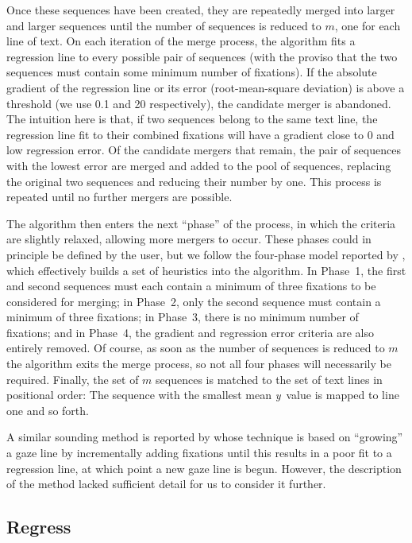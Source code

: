 \documentclass[doc,biblatex]{apa7}
\begin{document}
Once these sequences have been created, they are repeatedly merged into larger and larger sequences until the number of sequences is reduced to $m$, one for each line of text. On each iteration of the merge process, the algorithm fits a regression line to every possible pair of sequences (with the proviso that the two sequences must contain some minimum number of fixations). If the absolute gradient of the regression line or its error (root-mean-square deviation) is above a threshold (we use 0.1 and 20 respectively), the candidate merger is abandoned. The intuition here is that, if two sequences belong to the same text line, the regression line fit to their combined fixations will have a gradient close to 0 and low regression error. Of the candidate mergers that remain, the pair of sequences with the lowest error are merged and added to the pool of sequences, replacing the original two sequences and reducing their number by one. This process is repeated until no further mergers are possible.

The algorithm then enters the next ``phase'' of the process, in which the criteria are slightly relaxed, allowing more mergers to occur. These phases could in principle be defined by the user, but we follow the four-phase model reported by \textcite{Spakov:2019}, which effectively builds a set of heuristics into the algorithm. In Phase~1, the first and second sequences must each contain a minimum of three fixations to be considered for merging; in Phase~2, only the second sequence must contain a minimum of three fixations; in Phase~3, there is no minimum number of fixations; and in Phase~4, the gradient and regression error criteria are also entirely removed. Of course, as soon as the number of sequences is reduced to $m$ the algorithm exits the merge process, so not all four phases will necessarily be required. Finally, the set of $m$ sequences is matched to the set of text lines in positional order: The sequence with the smallest mean \textit{y}~value is mapped to line one and so forth.

A similar sounding method is reported by \textcite{Beymer:2005} whose technique is based on ``growing'' a gaze line by incrementally adding fixations until this results in a poor fit to a regression line, at which point a new gaze line is begun. However, the description of the method lacked sufficient detail for us to consider it further.

\subsection{Regress}
\end{document}
